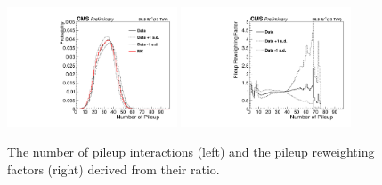 \begin{figure}[ht]
	\centering
	\includegraphics[width=0.45\textwidth]{figures/PileupDists.pdf}
	\hspace{0.01\textwidth}
	\includegraphics[width=0.45\textwidth]{figures/PileupRatioDists.pdf}
        \caption[Pileup Re-weighting Histograms]{The number of pileup interactions (left) and the pileup reweighting factors (right) derived from their ratio.}
        \label{fig:pileup}
\end{figure}

